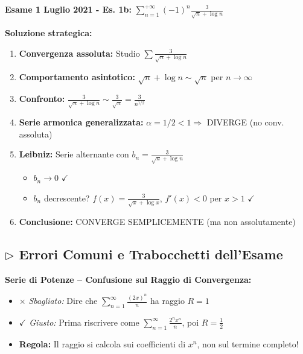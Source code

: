 \begin{esempio}
\textbf{Esame 1 Luglio 2021 - Es. 1b:} $\displaystyle\sum_{n=1}^{+\infty} (-1)^{n} \frac{3}{\sqrt{n} + \log n}$

\textbf{Soluzione strategica:}
\begin{enumerate}
    \item \textbf{Convergenza assoluta:} Studio $\sum \frac{3}{\sqrt{n} + \log n}$
    \item \textbf{Comportamento asintotico:} $\sqrt{n} + \log n \sim \sqrt{n}$ per $n \to \infty$
    \item \textbf{Confronto:} $\frac{3}{\sqrt{n} + \log n} \sim \frac{3}{\sqrt{n}} = \frac{3}{n^{1/2}}$
    \item \textbf{Serie armonica generalizzata:} $\alpha = 1/2 < 1 \Rightarrow$ DIVERGE (no conv. assoluta)
    \item \textbf{Leibniz:} Serie alternante con $b_n = \frac{3}{\sqrt{n} + \log n}$
        \begin{itemize}
            \item $b_n \to 0$ $\checkmark$
            \item \(b_n\) decrescente? \(f(x) = \frac{3}{\sqrt{x} + \log x}\), \(f'(x) < 0\) per \(x > 1\) $\checkmark$
        \end{itemize}
    \item \textbf{Conclusione:} CONVERGE SEMPLICEMENTE (ma non assolutamente)
\end{enumerate}
\end{esempio}

\subsection{$\triangleright$ Errori Comuni e Trabocchetti dell'Esame}

\begin{errore}
\textbf{Serie di Potenze -- Confusione sul Raggio di Convergenza:}
\begin{itemize}
    \item $\times$ \textit{Sbagliato:} Dire che $\sum_{n=1}^{\infty} \frac{(2x)^n}{n}$ ha raggio $R=1$
    \item $\checkmark$ \textit{Giusto:} Prima riscrivere come $\sum_{n=1}^{\infty} \frac{2^n x^n}{n}$, poi $R = \frac{1}{2}$
    \item \textbf{Regola:} Il raggio si calcola sui coefficienti di $x^n$, non sul termine completo!
\end{itemize}
\end{errore}

